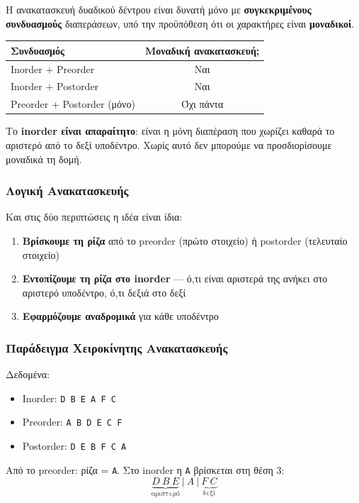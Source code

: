 \documentclass[a4paper,12pt]{article}
\begin{document}
	Η ανακατασκευή δυαδικού δέντρου είναι δυνατή μόνο με \textbf{συγκεκριμένους 
		συνδυασμούς} διαπεράσεων, υπό την προϋπόθεση ότι οι χαρακτήρες είναι 
	\textbf{μοναδικοί}.
	
	\begin{center}
		\begin{tabular}{|l|c|}
			\hline
			\textbf{Συνδυασμός} & \textbf{Μοναδική ανακατασκευή;} \\
			\hline
			Inorder + Preorder  & \checkmark Ναι \\
			Inorder + Postorder & \checkmark Ναι \\
			Preorder + Postorder (μόνο) & \texttimes{} Όχι πάντα \\
			\hline
		\end{tabular}
	\end{center}
	
	Το \textbf{inorder είναι απαραίτητο}: είναι η μόνη διαπέραση που χωρίζει 
	καθαρά το αριστερό από το δεξί υποδέντρο. Χωρίς αυτό δεν μπορούμε να 
	προσδιορίσουμε μοναδικά τη δομή.
	
	\subsubsection{Λογική Ανακατασκευής}
	Και στις δύο περιπτώσεις η ιδέα είναι ίδια:
	\begin{enumerate}
		\item \textbf{Βρίσκουμε τη ρίζα} από το preorder (πρώτο στοιχείο) 
		ή postorder (τελευταίο στοιχείο)
		\item \textbf{Εντοπίζουμε τη ρίζα στο inorder} — ό,τι είναι αριστερά 
		της ανήκει στο αριστερό υποδέντρο, ό,τι δεξιά στο δεξί
		\item \textbf{Εφαρμόζουμε αναδρομικά} για κάθε υποδέντρο
	\end{enumerate}
	
	\subsubsection{Παράδειγμα Χειροκίνητης Ανακατασκευής}
	Δεδομένα:
	\begin{itemize}
		\item Inorder:   \texttt{D B E A F C}
		\item Preorder:  \texttt{A B D E C F}
		\item Postorder: \texttt{D E B F C A}
	\end{itemize}
	
	Από το preorder: ρίζα = \texttt{A}. 
	Στο inorder η \texttt{A} βρίσκεται στη θέση 3:
	$$\underbrace{D\ B\ E}_{\text{αριστερό}}\ |\ A\ |\ \underbrace{F\ C}_{\text{δεξί}}$$
	
\end{document}
